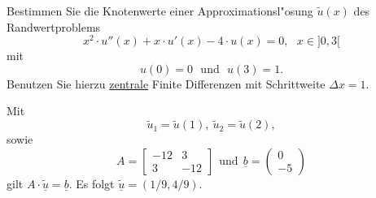 Bestimmen Sie die Knotenwerte einer Approximationsl"osung $\tilde u(x)$
des Randwertproblems
\[
x^2 \cdot u''(x) + x \cdot u'(x) - 4 \cdot u(x) = 0, \ \ \ x \in ]0,3[
\]
mit
\[
u(0) = 0 \ \ \ \mbox{und} \ \ \ u(3) = 1.
\]
Benutzen Sie hierzu \underline{zentrale} Finite Differenzen mit Schrittweite
$\Delta x = 1$. 

\begin{loesung}
Mit 
\[
\tilde u_1 = \tilde u(1), \ \tilde u_2 = \tilde u(2),
\]
sowie 
\[
A = \left[\begin{array}{rr} 
-12 & 3 \\
3 & -12 \end{array}\right] \ \ \text{und} \ \
\underline{b} =  \left(\begin{array}{r} 0 \\ -5 \end{array}\right)
\]
gilt  $A \cdot \underline{\tilde u} = \underline{b}.$
Es folgt $\underline{\tilde u} = (1/9, 4/9).$
\end{loesung}

